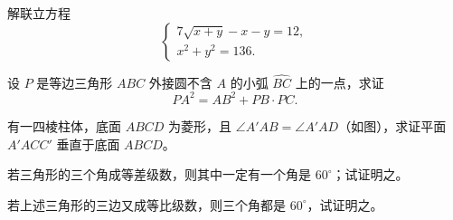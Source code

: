 \begin{question}
解联立方程
\[
\begin{cases}
7\sqrt{x+y}-x-y=12,\\
x^2+y^2=136.
\end{cases}
\]

\end{question}
\begin{question}
设 $P$ 是等边三角形 $ABC$ 外接圆不含 $A$ 的小弧 $\widehat{BC}$ 上的一点，求证
\[
PA^2=AB^2+PB\cdot PC.
\]

\Needspace{0.4\textheight}
\end{question}
\begin{question}
有一四棱柱体，底面 $ABCD$ 为菱形，且
$\angle A'AB=\angle A'AD$（如图），求证平面 $A'ACC'$ 垂直于底面 $ABCD$。
\nopagebreak[4]
\begin{center}\end{center}
\nopagebreak[4]
\end{question}
\begin{question}
若三角形的三个角成等差级数，则其中一定有一个角是 $60^\circ$；试证明之。

\end{question}
\begin{question}
若上述三角形的三边又成等比级数，则三个角都是 $60^\circ$，试证明之。

\end{question}